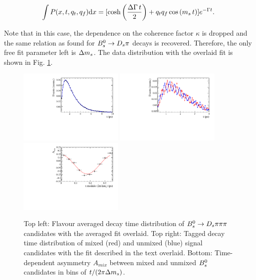 \begin{equation}
\int P(x,t,q_t,q_f) \text d x = [\text{cosh} \left( \frac{\Delta \Gamma \, t}{2}\right) + q_t q_f \, \text{cos} \left( m_s \, t \right)] e^{- \Gamma t}.
\end{equation}

Note that in this case, the dependence on the coherence factor $\kappa$ is dropped and the same relation as found for ${{B}^0_{s}}\rightarrow{\ensuremath{{D}_{s}}}{\ensuremath{\pi}}$ decays is recovered. 
Therefore, the only free fit parameter left is ${\Delta m_{{s}}}$. The data distribution with the overlaid fit is shown in Fig. \ref{fig:tFitNorm}.

\clearpage
\begin{figure}[h]
	\centering
		\includegraphics[width=0.45\textwidth, height = !]{figs/timeFit/norm_taggingCalib/h_t.pdf} 
		\includegraphics[width=0.45\textwidth, height = !]{figs/timeFit/norm_taggingCalib/h_t_mixed.pdf} 
		\includegraphics[width=0.45\textwidth, height = !]{figs/timeFit/norm_taggingCalib/h_asym.pdf} 		
		\caption{\small Top left: Flavour averaged decay time distribution of ${{B}^0_{s}}\rightarrow{\ensuremath{{D}_{s}}}{\ensuremath{\pi}}{\ensuremath{\pi}}{\ensuremath{\pi}}$ candidates with the averaged fit overlaid. 
Top right: Tagged decay time distribution of mixed (red) and unmixed (blue) signal candidates with the fit described in the text overlaid. 
Bottom: Time-dependent asymmetry $A_{mix}$ between mixed and unmixed ${{B}^0_{s}}$ candidates in bins of $t/(2\pi{\ensuremath{\Delta m_{{s}}}})$.} 		
		\label{fig:tFitNorm}
\end{figure}	

